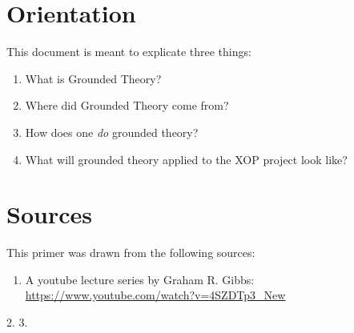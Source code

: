 \documentclass[10pt, letterpaper]{article}
\begin{document}
\section*{Orientation}
\label{sec:orgd671398}
This document is meant to explicate three things:
\begin{enumerate}
\item What is Grounded Theory?
\item Where did Grounded Theory come from?
\item How does one \emph{do} grounded theory?
\item What will grounded theory applied to the XOP project look like?
\end{enumerate}


\section*{Sources}
\label{sec:orgb4f96c6}
This primer was drawn from the following sources:
\begin{enumerate}
\item A youtube lecture series by Graham R. Gibbs: \url{https://www.youtube.com/watch?v=4SZDTp3\_New}
\end{enumerate}
2.\cite{charmaz2006constructing} 
3.\cite{corbin2014basics} 



\end{document}
